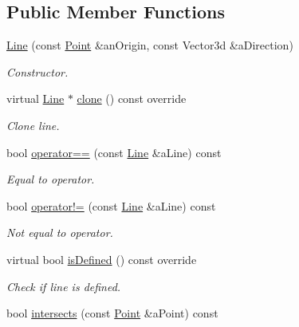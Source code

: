 \subsection*{Public Member Functions}
\begin{DoxyCompactItemize}
\item 
\hyperlink{classlibrary_1_1math_1_1geom_1_1d3_1_1objects_1_1_line_a762e529453ff9ffa9233fd73737f4692}{Line} (const \hyperlink{classlibrary_1_1math_1_1geom_1_1d3_1_1objects_1_1_point}{Point} \&an\+Origin, const Vector3d \&a\+Direction)
\begin{DoxyCompactList}\small\item\em Constructor. \end{DoxyCompactList}\item 
virtual \hyperlink{classlibrary_1_1math_1_1geom_1_1d3_1_1objects_1_1_line}{Line} $\ast$ \hyperlink{classlibrary_1_1math_1_1geom_1_1d3_1_1objects_1_1_line_a55382b24007bccdae721176d0f73536f}{clone} () const override
\begin{DoxyCompactList}\small\item\em Clone line. \end{DoxyCompactList}\item 
bool \hyperlink{classlibrary_1_1math_1_1geom_1_1d3_1_1objects_1_1_line_a2e5b0da1d652abbff16d7024f8eecb0a}{operator==} (const \hyperlink{classlibrary_1_1math_1_1geom_1_1d3_1_1objects_1_1_line}{Line} \&a\+Line) const
\begin{DoxyCompactList}\small\item\em Equal to operator. \end{DoxyCompactList}\item 
bool \hyperlink{classlibrary_1_1math_1_1geom_1_1d3_1_1objects_1_1_line_ae49d3224ab2f209f192bb3b1e152766e}{operator!=} (const \hyperlink{classlibrary_1_1math_1_1geom_1_1d3_1_1objects_1_1_line}{Line} \&a\+Line) const
\begin{DoxyCompactList}\small\item\em Not equal to operator. \end{DoxyCompactList}\item 
virtual bool \hyperlink{classlibrary_1_1math_1_1geom_1_1d3_1_1objects_1_1_line_ab7b509259a32ac21c83bb14fcc7f83f3}{is\+Defined} () const override
\begin{DoxyCompactList}\small\item\em Check if line is defined. \end{DoxyCompactList}\item 
bool \hyperlink{classlibrary_1_1math_1_1geom_1_1d3_1_1objects_1_1_line_af40668ee33a6cd265a4b3c3a9a53f294}{intersects} (const \hyperlink{classlibrary_1_1math_1_1geom_1_1d3_1_1objects_1_1_point}{Point} \&a\+Point) const

\end{DoxyCompactItemize}
